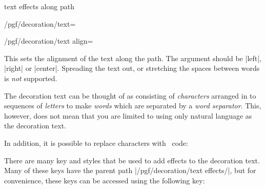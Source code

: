 \begin{decoration}{text effects along path}
\begin{key}{/pgf/decoration/text=}
\end{key}



\begin{key}{/pgf/decoration/text align=}

  This sets the alignment of the text along the path.
  The  argument should be |left|, |right| or |center|.
  Spreading the text out, or stretching the spaces between
  words is \emph{not} supported.
  
\end{key}

	The decoration text can be thought of as consisting
	of \emph{characters} arranged in to sequences of \emph{letters}
	to make \emph{words} which are separated by a \emph{word separator}.
	This, however, does not mean that you are limited to using only
	natural language as the decoration text.

\begin{codeexample}[]
\end{codeexample}
	
	 In addition, it is possible to replace characters
	 with \tikzname\ code:
	 
\begin{codeexample}[]
\end{codeexample}

	 
  There are many key and styles that be used to add effects
	 to the decoration text.
	 Many of these keys have the parent path |/pgf/decoration/text effects/|,
	 but for convenience, these keys can be accessed using the following
	 key:
	 

\end{decoration}
